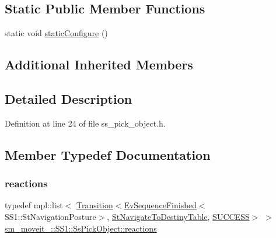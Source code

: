 \subsection*{Static Public Member Functions}
\begin{DoxyCompactItemize}
\item 
static void \hyperlink{structsm__moveit__4_1_1SS1_1_1SsPickObject_a14f0fa7ceafbbb3a1aca1475225ed5ce}{static\+Configure} ()
\end{DoxyCompactItemize}
\subsection*{Additional Inherited Members}


\subsection{Detailed Description}


Definition at line 24 of file ss\+\_\+pick\+\_\+object.\+h.



\subsection{Member Typedef Documentation}
\mbox{\label{structsm__moveit__4_1_1SS1_1_1SsPickObject_a91d86d49b71983c289daceda785cd5b2}} 
\subsubsection{\texorpdfstring{reactions}{reactions}}
{\footnotesize\ttfamily typedef mpl\+::list$<$ \hyperlink{classsmacc_1_1Transition}{Transition}$<$\hyperlink{structsmacc_1_1default__events_1_1EvSequenceFinished}{Ev\+Sequence\+Finished}$<$S\+S1\+::\+St\+Navigation\+Posture$>$, \hyperlink{structsm__moveit__4_1_1StNavigateToDestinyTable}{St\+Navigate\+To\+Destiny\+Table}, \hyperlink{structsmacc_1_1default__transition__tags_1_1SUCCESS}{S\+U\+C\+C\+E\+SS}$>$ $>$ \hyperlink{structsm__moveit__4_1_1SS1_1_1SsPickObject_a91d86d49b71983c289daceda785cd5b2}{sm\+\_\+moveit\+\_\+::\+S\+S1\+::\+Ss\+Pick\+Object\+::reactions}}



